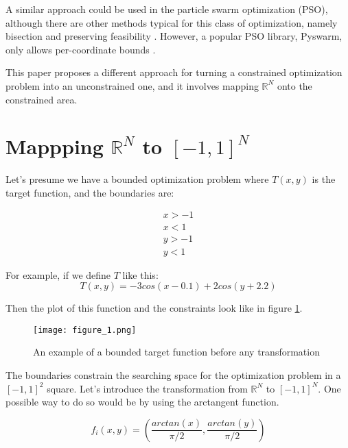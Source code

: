 \documentclass[
	a4paper, %
	10pt, %
	unnumberedsections, %
	twoside, %
]{LTJournalArticle}
\begin{document}
A similar approach could be used in the particle swarm optimization (PSO), although there are other methods typical for this class of optimization, namely bisection and preserving feasibility \cite{Innocente:2021}. However, a popular PSO library, Pyswarm, only allows per-coordinate bounds \cite{Miranda:2018}.

This paper proposes a different approach for turning a constrained optimization problem into an unconstrained one, and it involves mapping $\mathbb{R}^N$ onto the constrained area.

\section{Mappping $\mathbb{R}^N$ to $[-1, 1]^N$}

Let's presume we have a bounded optimization problem where $T(x, y)$ is the target function, and the boundaries are:

\begin{equation}
	\begin{array}{cc}
	x > -1 \\
	x < 1 \\
	y > -1 \\
	y < 1
	\end{array}
	\label{eq:boundaries}
\end{equation}

For example, if we define $T$ like this:
\begin{equation}
	T(x, y) = -3 cos(x - 0.1) + 2 cos(y + 2.2)
\end{equation}

Then the plot of this function and the constraints look like in figure \ref{fig:before1}. 

\begin{figure} 
	\texttt{[image: figure\_1.png]}
	\caption{An example of a bounded target function before any transformation}
	\label{fig:before1}
\end{figure}

The boundaries constrain the searching space for the optimization problem in a $[-1, 1]^2$ square. Let's introduce the transformation from $\mathbb{R}^N$ to $[-1, 1]^N$. One possible way to do so would be by using the arctangent function.

\begin{equation}
	f_i(x, y) = (\frac{arctan(x)}{\pi / 2}, \frac{arctan(y)}{\pi / 2})
	\label{eq:arctan_2d}
\end{equation}
\end{document}
